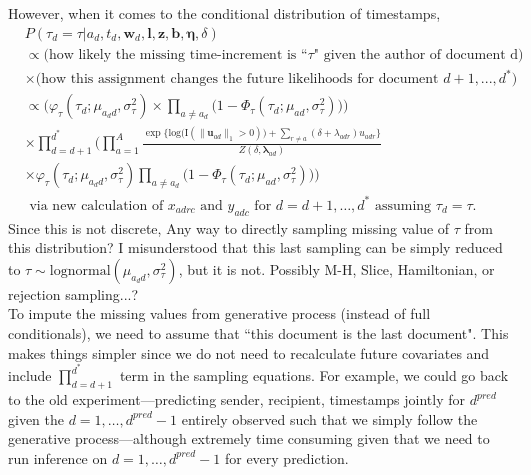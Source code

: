 \documentclass[12pt,a4paper]{article}
\begin{document}
However, when it comes to the conditional distribution of timestamps,  
\begin{equation}
\begin{aligned}
&P(\tau_{d} = \tau|a_d, t_d, \boldsymbol{w}_d, \boldsymbol{l}, \boldsymbol{z}, \boldsymbol{b}, \boldsymbol{\eta},\delta)\\& \propto \mbox{(how likely the missing time-increment is ``$\tau$" given the author of document d)} \\&\times \mbox{(how this assignment changes the future likelihoods for document }   d+1,...,d^*) 
\\&  \propto \Big(\varphi_{\tau}(\tau_{d}; \mu_{a_d d}, \sigma_\tau^2)\times \prod_{a\neq a_d}\big(1-\Phi_{\tau}(\tau_{d}; \mu_{a d}, \sigma_\tau^2) \big)\Big)\\& \times
\prod_{d=d+1}^{d^*}\Big(\prod_{a=1}^A \frac{\exp\Big\{\mbox{log}\big(\text{I}( \lVert \boldsymbol{u}_{ad}\rVert_1 > 0)\big) + \sum\limits_{r \neq a} (\delta+\lambda_{adr})u_{adr}\Big\}}{Z(\delta,\boldsymbol{\lambda}_{ad})}\\&\times\varphi_{\tau}(\tau_{d}; \mu_{a_d d}, \sigma_\tau^2) \prod_{a\neq a_d}\big(1-\Phi_{\tau}(\tau_{d}; \mu_{a d}, \sigma_\tau^2) \big)\Big)\\& \mbox{ via new calculation of $x_{adrc}$  and $y_{adc}$ for $d=d+1,\ldots, d^*$ assuming $\tau_d=\tau$}.
\end{aligned}                                                                         
\end{equation}                                                  
Since this is not discrete, Any way to directly sampling missing value of $\tau$ from this distribution? I misunderstood that this last sampling can be simply reduced to $\tau \sim \mbox{lognormal}(\mu_{a_dd}, \sigma_\tau^2)$, but it is not. Possibly M-H, Slice, Hamiltonian, or rejection sampling...?\\\newline
To impute the missing values from generative process (instead of full conditionals), we need to assume that ``this document is the last document". This makes things simpler since we do not need to recalculate future covariates and include $\prod_{d=d+1}^{d^*}$ term in the sampling equations. For example, we could go back to the old experiment---predicting sender, recipient, timestamps jointly for $d^{pred}$ given the $d=1,\ldots,d^{pred}-1$ entirely observed such that we simply follow the generative process---although extremely time consuming given that we need to run inference on $d=1,\ldots,d^{pred}-1$ for every prediction.
\end{document}
